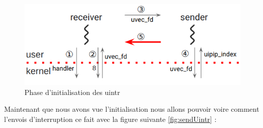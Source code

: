 \begin{figure}[H]
  \includegraphics[width=\textwidth]{images/uintrInit.png}
  \caption{Phase d'initialisation des uintr}
  \label{fig:initUintr}
\end{figure}


Maintenant que nous avons vue l'initialisation nous allons pouvoir voire comment l'envois d'interruption ce fait avec la figure suivante \ref{fig:sendUintr} :

